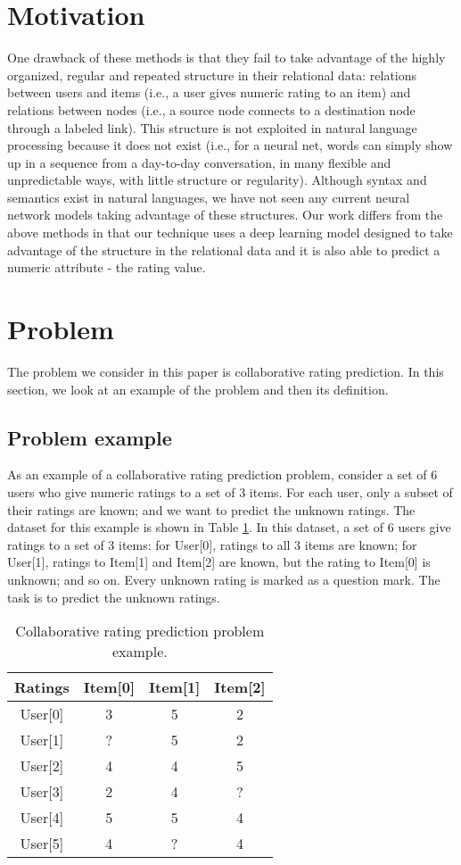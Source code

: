 \documentclass[conference]{IEEEtran}
\begin{document}
\section{Motivation}
One drawback of these methods is that they fail to take advantage of 
the highly organized, regular and repeated structure in their relational data: 
relations between users and items (i.e., a user gives numeric rating to an 
item) and relations between nodes (i.e., a source node connects to a 
destination node through a labeled link).
This structure is not exploited in natural language processing because it 
does not exist (i.e., for a neural net, words can simply show up in a sequence 
from a day-to-day conversation, in many flexible and unpredictable ways, with 
little structure or regularity).
Although syntax and semantics exist in natural languages, we have not seen any 
current neural network models taking advantage of these structures.
Our work differs from the above methods in that our technique uses a 
deep learning model designed to take advantage of the structure in the 
relational data and it is also able to predict a numeric attribute - the rating 
value.

\section{Problem}
The problem we consider in this paper is collaborative rating prediction.
In this section, we look at an example of the problem and then its definition.

\subsection{Problem example}
As an example of a collaborative rating prediction problem, consider 
a set of 6 users who give numeric ratings to a set of 3 items.
For each user, only a subset of their ratings are known; 
and we want to predict the unknown ratings.
The dataset for this example is shown in Table \ref{tab:ratings}.
In this dataset, a set of 6 users give ratings to a set of 3 items: 
for User[0], ratings to all 3 items are known; 
for User[1], ratings to Item[1] and Item[2] are known, 
but the rating to Item[0] is unknown; and so on.
Every unknown rating is marked as a question mark.
The task is to predict the unknown ratings.
\begin{table}[!ht]
	\centering
	\caption{Collaborative rating prediction problem example.}
	\begin{tabular}{cccc} \hline
		Ratings & Item[0] & Item[1] & Item[2] \\ \hline
		User[0] & 3       & 5       & 2 \\ \hline
		User[1] & ?       & 5       & 2 \\ \hline
		User[2] & 4       & 4       & 5 \\ \hline
		User[3] & 2       & 4       & ? \\ \hline
		User[4] & 5       & 5       & 4 \\ \hline
		User[5] & 4       & ?       & 4 \\ \hline
	\end{tabular}
	\label{tab:ratings}
\end{table}
\end{document}
